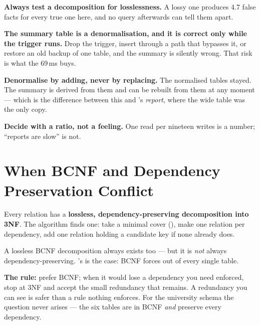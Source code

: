\begin{alertbox}
\begin{tight}
  \item \textbf{Always test a decomposition for losslessness.} A lossy one
        produces 4.7 false facts for every true one here, and no query
        afterwards can tell them apart.
  \item \textbf{The summary table is a denormalisation, and it is correct only
        while the trigger runs.} Drop the trigger, insert through a path that
        bypasses it, or restore an old backup of one table, and the summary is
        silently wrong. That risk is what the 69\,ms buys.
  \item \textbf{Denormalise by adding, never by replacing.} The normalised
        tables stayed. The summary is derived from them and can be rebuilt
        from them at any moment --- which is the difference between this and
        's \textit{report}, where the wide table was the
        only copy.
  \item \textbf{Decide with a ratio, not a feeling.} One read per nineteen
        writes is a number; ``reports are slow'' is not.
\end{tight}
\end{alertbox}

\section{When BCNF and Dependency Preservation Conflict}

\begin{conceptbox}
Every relation has a \textbf{lossless, dependency-preserving decomposition into
3NF}. The  algorithm finds one: take a minimal cover
(), make one relation per dependency, add one relation holding a
candidate key if none already does.

\smallskip
A lossless BCNF decomposition always exists too --- but it is \emph{not}
always dependency-preserving. 's
 is the case: BCNF forces
 out of every single table.

\smallskip
\textbf{The rule:} prefer BCNF; when it would lose a dependency you need
enforced, stop at 3NF and accept the small redundancy that remains. A
redundancy you can see is safer than a rule nothing enforces. For the
university schema the question never arises --- the six tables are in BCNF
\emph{and} preserve every dependency.
\end{conceptbox}

